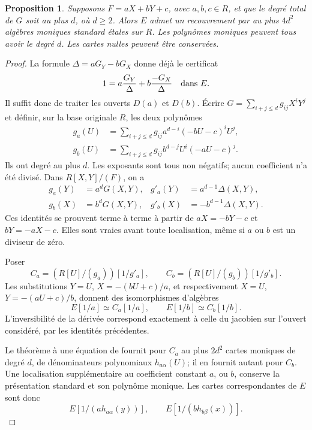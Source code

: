 \documentclass[11pt]{amsart}
\newtheorem{proposition}[lemma]{Proposition}
\begin{document}
\begin{proposition}\label{linear-two}
Supposons $F=aX+bY+c$, avec $a,b,c\in R$, et que le degré total
de $G$ soit au plus $d$, où $d\geq2$. Alors $E$ admet un recouvrement
par au plus $4d^2$ algèbres moniques standard étales sur $R$.
Les polynômes moniques peuvent tous avoir le degré $d$.
Les cartes nulles peuvent être conservées.
\end{proposition}
\begin{proof}
La formule $\Delta=aG_Y-bG_X$ donne déjà le certificat
\[
                     1=a\frac{G_Y}{\Delta}
                         +b\frac{-G_X}{\Delta}
                     \quad\hbox{dans }E.
\]
Il suffit donc de traiter les ouverts $D(a)$ et $D(b)$.
Écrire $G=\sum_{i+j\leq d}g_{ij}X^iY^j$ et définir, sur la base
originale $R$, les deux polynômes
\begin{align*}
 g_a(U)&=\sum_{i+j\leq d}g_{ij}a^{d-i}(-bU-c)^iU^j,\\
 g_b(U)&=\sum_{i+j\leq d}g_{ij}b^{d-j}U^i(-aU-c)^j.
\end{align*}
Ils ont degré au plus $d$. Les exposants sont tous non négatifs;
aucun coefficient n'a été divisé. Dans $R[X,Y]/(F)$, on a
\begin{align*}
 g_a(Y)&=a^dG(X,Y),& g'_a(Y)&=a^{d-1}\Delta(X,Y),\\
 g_b(X)&=b^dG(X,Y),& g'_b(X)&=-b^{d-1}\Delta(X,Y).
\end{align*}
Ces identités se prouvent terme à terme à partir de
$aX=-bY-c$ et $bY=-aX-c$. Elles sont vraies avant toute
localisation, même si $a$ ou $b$ est un diviseur de zéro.

Poser
\[
 C_a=(R[U]/(g_a))[1/g'_a],\qquad
 C_b=(R[U]/(g_b))[1/g'_b].
\]
Les substitutions $Y=U$, $X=-(bU+c)/a$, et respectivement
$X=U$, $Y=-(aU+c)/b$, donnent des isomorphismes d'algèbres
\[
                         E[1/a]\simeq C_a[1/a],\qquad
                         E[1/b]\simeq C_b[1/b].
\]
L'inversibilité de la dérivée correspond exactement à celle du
jacobien sur l'ouvert considéré, par les identités précédentes.

Le théorème à une équation de
 fournit pour $C_a$ au plus
$2d^2$ cartes moniques de degré $d$, de dénominateurs polynomiaux
$h_{a\alpha}(U)$; il en fournit autant pour $C_b$.
Une localisation supplémentaire au coefficient constant $a$, ou $b$,
conserve la présentation standard et son polynôme monique.
Les cartes correspondantes de $E$ sont donc
\[
          E[1/(a h_{a\alpha}(y))],\qquad
          E[1/(b h_{b\beta}(x))].
\]


\end{proof}
\end{document}
